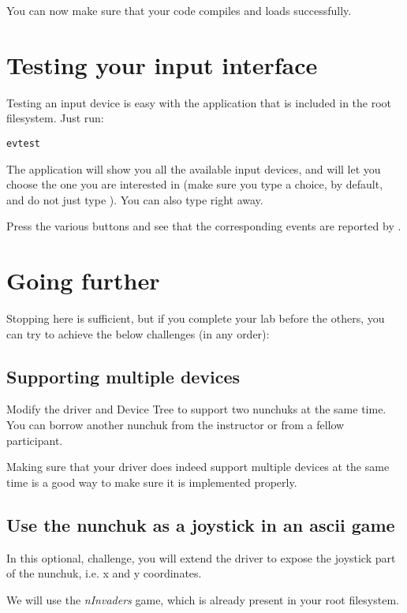 You can now make sure that your code compiles and loads successfully.

\section{Testing your input interface}

Testing an input device is easy with the  application
that is included in the root filesystem. Just run:

\begin{verbatim}
evtest
\end{verbatim}

The application will show you all the available input devices, and will let
you choose the one you are interested in (make sure you type a choice,
 by default, and do not just type \code{[Enter]}). You can also
type  right away.

Press the various buttons and see that the corresponding events are
reported by .

\section{Going further}

Stopping here is sufficient, but if you complete your lab before the
others, you can try to achieve the below challenges (in any order):

\subsection{Supporting multiple devices}

Modify the driver and Device Tree to support two nunchuks at the same
time. You can borrow another nunchuk from the instructor or from a fellow
participant.

Making sure that your driver does indeed support multiple devices at the
same time is a good way to make sure it is implemented properly.

\subsection{Use the nunchuk as a joystick in an ascii game}

In this optional, challenge, you will extend the driver to expose
the joystick part of the nunchuk, i.e. x and y coordinates.

We will use the {\em nInvaders} game, which is already present in
your root filesystem.

